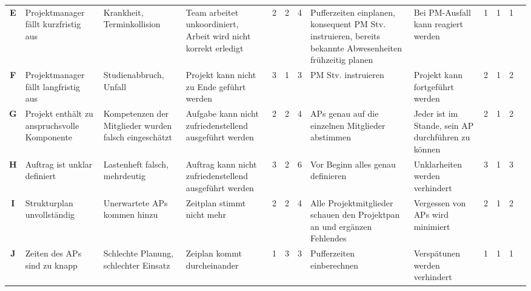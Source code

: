 \begin{table}[H]
{\begin{tabular}{|c|>{\HY\RaggedRight}p{2.5cm}|>{\HY\RaggedRight}p{2.5cm}|>{\HY\RaggedRight}p{2.5cm}|c|c|c|>{\HY\RaggedRight}p{3cm}|>{\HY\RaggedRight}p{3cm}|c|c|c|c|}
\textbf{E}			&Projektmanager fällt kurzfristig aus			&Krankheit, Terminkollision															&Team arbeitet unkoordiniert, Arbeit wird nicht korrekt erledigt	&2			&2			&\cellcolor{dgelb}4				&Pufferzeiten einplanen, konsequent PM Stv. instruieren, bereits bekannte Abwesenheiten frühzeitig planen	&Bei PM-Ausfall kann reagiert werden																			&1				&1				&\cellcolor{dgruen}1		&\\
\rowcolor{grau}
\textbf{F}			&Projektmanager fällt langfristig aus			&Studienabbruch, Unfall																&Projekt kann nicht zu Ende geführt werden						&3			&1			&\cellcolor{hgelb}3				&PM Stv. instruieren																						&Projekt kann fortgeführt werden																				&2				&1				&\cellcolor{hgruen}2		&\\

\textbf{G}			&Projekt enthält zu anspruchsvolle Komponente		&Kompetenzen der Mitglieder wurden falsch eingeschätzt								&Aufgabe kann nicht zufriedenstellend ausgeführt werden			&2			&2			&\cellcolor{dgelb}4				&APs genau auf die einzelnen Mitglieder abstimmen															&Jeder ist im Stande, sein AP durchführen zu können															&2				&1				&\cellcolor{hgruen}2		&\\
\rowcolor{grau}
\textbf{H}			&Auftrag ist unklar definiert					&Lastenheft falsch, mehrdeutig														&Auftrag kann nicht zufriedenstellend ausgeführt werden			&3			&2			&\cellcolor{orange}6				&Vor Beginn alles genau definieren																		&Unklarheiten werden verhindert																				&3				&1				&\cellcolor{hgelb}3		&\\

\textbf{I}			&Strukturplan unvollständig						&Unerwartete APs kommen hinzu														&Zeitplan stimmt nicht mehr										&2			&2			&\cellcolor{dgelb}4				&Alle Projektmitglieder schauen den Projektpan an und ergänzen Fehlendes									&Vergessen von APs wird minimiert																			&2				&1				&\cellcolor{hgruen}2		&\\
\rowcolor{grau}
\textbf{J}			&Zeiten des APs sind zu knapp					&Schlechte Planung, schlechter Einsatz												&Zeiplan kommt durcheinander										&1			&3			&\cellcolor{hgelb}3				&Pufferzeiten einberechnen																				&Verspätunen werden verhindert																				&1				&1				&\cellcolor{dgruen}1		&\\


\end{tabular}}
\end{table}
